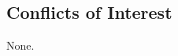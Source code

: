 \documentclass[nolinenum]{jfp}
\begin{document}
\maketitle














\subsection*{Conflicts of Interest}

None.






\clearpage

\appendix












\label{lastpage01}
\end{document}
